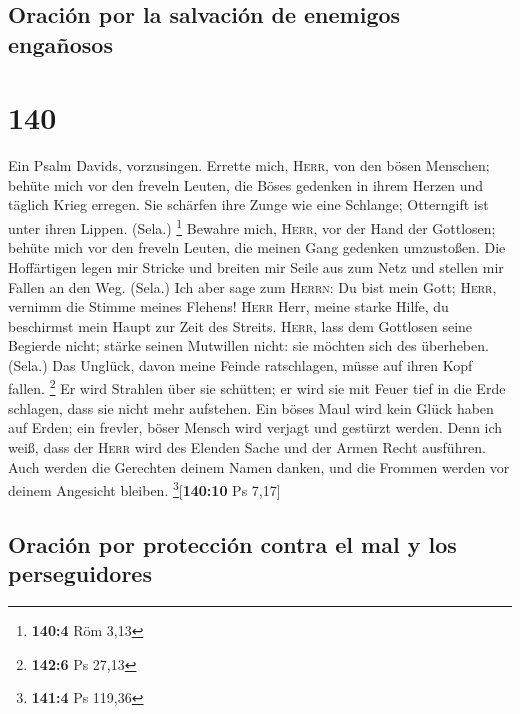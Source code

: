 \hypertarget{oraciuxf3n-por-la-salvaciuxf3n-de-enemigos-engauxf1osos}{%
\subsection{Oración por la salvación de enemigos
engañosos}\label{oraciuxf3n-por-la-salvaciuxf3n-de-enemigos-engauxf1osos}}

\hypertarget{section-139}{%
\section{140}\label{section-139}}

 Ein Psalm Davids, vorzusingen.  Errette
mich, \textsc{Herr}, von den bösen Menschen; behüte mich vor den freveln
Leuten,  die Böses gedenken in ihrem Herzen und täglich
Krieg erregen.  Sie schärfen ihre Zunge wie eine Schlange;
Otterngift ist unter ihren Lippen. (Sela.) \footnote{\textbf{140:4} Röm
  3,13}  Bewahre mich, \textsc{Herr}, vor der Hand der
Gottlosen; behüte mich vor den freveln Leuten, die meinen Gang gedenken
umzustoßen.  Die Hoffärtigen legen mir Stricke und breiten
mir Seile aus zum Netz und stellen mir Fallen an den Weg. (Sela.)
 Ich aber sage zum \textsc{Herrn}: Du bist mein Gott;
\textsc{Herr}, vernimm die Stimme meines Flehens! 
\textsc{Herr} Herr, meine starke Hilfe, du beschirmst mein Haupt zur
Zeit des Streits.  \textsc{Herr}, lass dem Gottlosen seine
Begierde nicht; stärke seinen Mutwillen nicht: sie möchten sich des
überheben. (Sela.)  Das Unglück, davon meine Feinde
ratschlagen, müsse auf ihren Kopf fallen. \footnote{\textbf{142:6} Ps
  27,13}  Er wird Strahlen über sie schütten; er wird sie
mit Feuer tief in die Erde schlagen, dass sie nicht mehr aufstehen.
 Ein böses Maul wird kein Glück haben auf Erden; ein
frevler, böser Mensch wird verjagt und gestürzt werden. 
Denn ich weiß, dass der \textsc{Herr} wird des Elenden Sache und der
Armen Recht ausführen.  Auch werden die Gerechten deinem
Namen danken, und die Frommen werden vor deinem Angesicht bleiben.
\footnote{\textbf{141:4} Ps 119,36}{[}\textbf{140:10} Ps 7,17{]}

\hypertarget{oraciuxf3n-por-protecciuxf3n-contra-el-mal-y-los-perseguidores}{%
\subsection{Oración por protección contra el mal y los
perseguidores}\label{oraciuxf3n-por-protecciuxf3n-contra-el-mal-y-los-perseguidores}}

